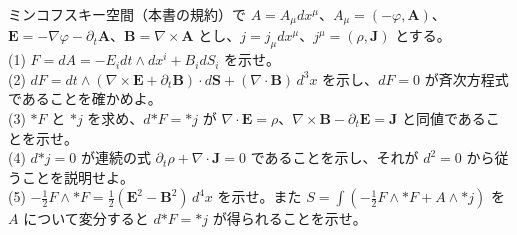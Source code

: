 \begin{problem}[難易度 B]\label{ch05-prob-maxwell}
ミンコフスキー空間（本書の規約）で $A=A_\mu dx^\mu$、$A_\mu=(-\varphi,\bm A)$、$\bm E=-\nabla\varphi-\partial_t\bm A$、$\bm B=\nabla\times\bm A$ とし、$j=j_\mu dx^\mu$、$j^\mu=(\rho,\bm J)$ とする。\\
(1) $F=dA=-E_idt\wedge dx^i+B_idS_i$ を示せ。\\
(2) $dF=dt\wedge(\nabla\times\bm E+\partial_t\bm B)\cdot d\bm S+(\nabla\cdot\bm B)\,d^3x$ を示し、$dF=0$ が斉次方程式であることを確かめよ。\\
(3) ${*F}$ と ${*j}$ を求め、$d{*F}={*j}$ が $\nabla\cdot\bm E=\rho$、$\nabla\times\bm B-\partial_t\bm E=\bm J$ と同値であることを示せ。\\
(4) $d{*j}=0$ が連続の式 $\partial_t\rho+\nabla\cdot\bm J=0$ であることを示し、それが $d^2=0$ から従うことを説明せよ。\\
(5) $-\tfrac12F\wedge{*F}=\tfrac12(\bm E^2-\bm B^2)\,d^4x$ を示せ。また $S=\int(-\tfrac12F\wedge{*F}+A\wedge{*j})$ を $A$ について変分すると $d{*F}={*j}$ が得られることを示せ。
\end{problem}

